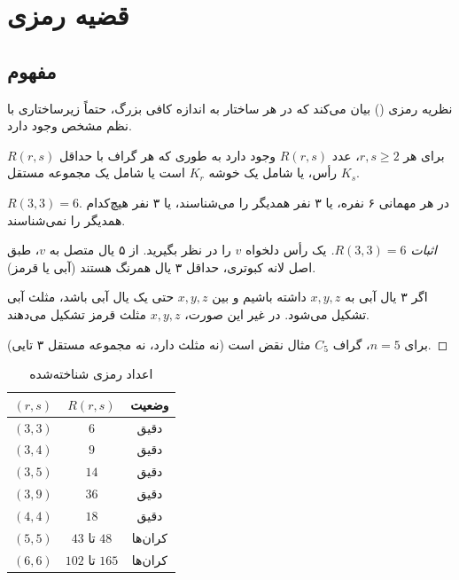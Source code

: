 \documentclass{matinbook}
\begin{document}
    \section{قضیه رمزی}
    
    \subsection{مفهوم}
    
    نظریه رمزی
    () بیان می‌کند
    که در هر ساختار به اندازه کافی بزرگ،
    حتماً زیرساختاری با نظم مشخص وجود دارد.
    
    \begin{theorem}
        برای هر $r, s \geq 2$، عدد $R(r, s)$
        وجود دارد به طوری که هر گراف
        با حداقل $R(r, s)$ رأس،
        یا شامل یک خوشه $K_{r}$ است
        یا شامل یک مجموعه مستقل $K_{s}$.
        \label{thm:ramsey}
    \end{theorem}
    
    \begin{example}
        $R(3,3) = 6$. در هر مهمانی ۶ نفره،
        یا ۳ نفر همدیگر را می‌شناسند،
        یا ۳ نفر هیچ‌کدام همدیگر را نمی‌شناسند.
        \label{ex:r33}
    \end{example}
    
    \begin{proof}[اثبات $R(3,3) = 6$]
        یک رأس دلخواه $v$ را در نظر بگیرید.
        از ۵ یال متصل به $v$،
        طبق اصل لانه کبوتری،
        حداقل ۳ یال همرنگ هستند (آبی یا قرمز).
        
        اگر ۳ یال آبی به $x, y, z$ داشته باشیم
        و بین $x, y, z$ حتی یک یال آبی باشد،
        مثلث آبی تشکیل می‌شود.
        در غیر این صورت، $x, y, z$
        مثلث قرمز تشکیل می‌دهند.
        
        برای $n = 5$، گراف $C_{5}$ مثال نقض است
        (نه مثلث دارد، نه مجموعه مستقل ۳ تایی).
    \end{proof}
    
    \begin{table}[h]
        \centering
        \caption{اعداد رمزی شناخته‌شده}
        \label{tab:ramsey-numbers}
        \begin{tabular}{|c|c|c|}
            \hline
            \textbf{$(r, s)$} & \textbf{$R(r, s)$} & \textbf{وضعیت} \\
            \hline
            $(3, 3)$ & $6$ & دقیق \\
            $(3, 4)$ & $9$ & دقیق \\
            $(3, 5)$ & $14$ & دقیق \\
            $(3, 9)$ & $36$ & دقیق \\
            $(4, 4)$ & $18$ & دقیق \\
            $(5, 5)$ & $43$ تا $48$ & کران‌ها \\
            $(6, 6)$ & $102$ تا $165$ & کران‌ها \\
            \hline
        \end{tabular}
    \end{table}
    
\end{document}
